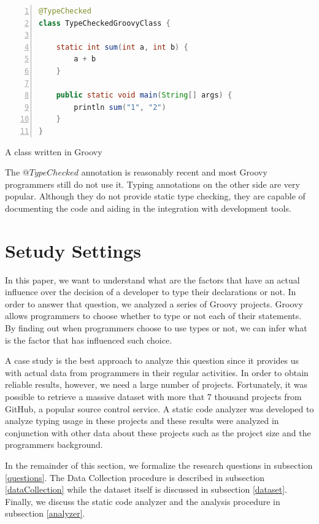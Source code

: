 \documentclass[preprint]{sigplanconf}
\begin{document}
\begin{Listing}[ht]
\begin{lstlisting}[language=Java,tabsize=2,breaklines=true,numbers=left]
@TypeChecked
class TypeCheckedGroovyClass {
	
	static int sum(int a, int b) {
		a + b
	}

	public static void main(String[] args) {
		println sum("1", "2")
	}
}
\end{lstlisting}
\caption{A class written in Groovy}
\label{staticTyping}
\end{Listing}

The $@TypeChecked$ annotation is reasonably recent and most Groovy programmers still do not use it. 
Typing annotations on the other side are very popular.
Although they do not provide static type checking, they are capable of documenting the code and aiding in the integration with development tools.








%
%

\section{Setudy Settings\label{sec:Methodology}}
In this paper, we want to understand what are the factors that have an actual influence over the decision of a developer to type their declarations or not. 
In order to answer that question, we analyzed a series of Groovy projects.
Groovy allows programmers to choose whether to type or not each of their statements.
By finding out when programmers choose to use types or not, we can infer what is the factor that has influenced such choice.

A case study is the best approach to analyze this question since it provides us with actual data from programmers in their regular activities.
In order to obtain reliable results, however, we need a large number of projects.
Fortunately, it was possible to retrieve a massive dataset with more that 7 thousand projects from GitHub, a popular source control service. 
A static code analyzer was developed to analyze typing usage in these projects and these results were analyzed in conjunction with other data about these projects such as the project size and the programmers background.


In the remainder of this section, we formalize the research questions in subsection \ref{questions}. The Data Collection procedure is described in subsection \ref{dataCollection} while the dataset itself is discussed in subsection \ref{dataset}. Finally, we discuss the static code analyzer and the analysis procedure in subsection \ref{analyzer}.
\end{document}
